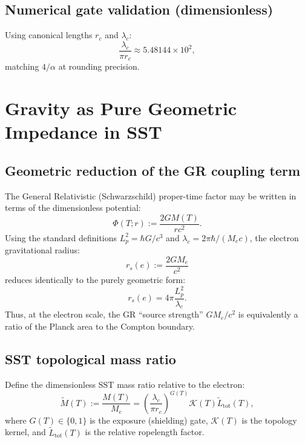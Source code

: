 \documentclass[11pt, a4paper]{article}
\begin{document}
            \subsection{Numerical gate validation (dimensionless)}
                Using canonical lengths $r_c$ and $\lambda_c$:
                \begin{equation}
                    \frac{\lambda_c}{\pi r_c} \approx 5.48144\times 10^2,
                \end{equation}
                matching $4/\alpha$ at rounding precision.
        
        \section{Gravity as Pure Geometric Impedance in SST}
            
            \subsection{Geometric reduction of the GR coupling term}
                The General Relativistic (Schwarzschild) proper-time factor may be written in terms of the dimensionless potential:
                \begin{equation}
                    \Phi(T;r) := \frac{2G M(T)}{r c^2}.
                \end{equation}
                Using the standard definitions $L_p^2=\hbar G/c^3$ and $\lambda_c=2\pi\hbar/(M_e c)$, the electron gravitational radius:
                \begin{equation}
                    r_s(e) := \frac{2G M_e}{c^2}
                \end{equation}
                reduces identically to the purely geometric form:
                \begin{equation}
                    r_s(e) = 4\pi \frac{L_p^2}{\lambda_c}.
                \end{equation}
                Thus, at the electron scale, the GR ``source strength'' $GM_e/c^2$ is equivalently a ratio of the Planck area to the Compton boundary.
            
            \subsection{SST topological mass ratio}
                Define the dimensionless SST mass ratio relative to the electron:
                \begin{equation}
                    \tilde{M}(T) := \frac{M(T)}{M_e} = \left( \frac{\lambda_c}{\pi r_c} \right)^{G(T)} \mathcal{K}(T) \tilde{L}_{\mathrm{tot}}(T),
                \end{equation}
                where $G(T)\in\{0,1\}$ is the exposure (shielding) gate, $\mathcal{K}(T)$ is the topology kernel, and
                $\tilde{L}_{\mathrm{tot}}(T)$ is the relative ropelength factor.
            
\end{document}
